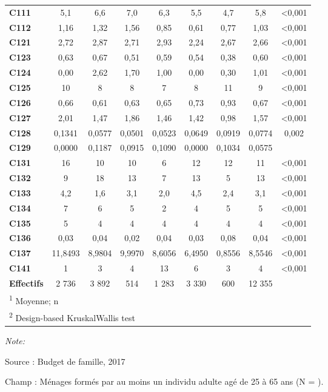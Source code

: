 \documentclass[
  12pt,
]{book}
\begin{document}
\begin{table}[!h]
{\begin{threeparttable}
\begin{tabular}[t]{lcccccccc}
\textbf{C111} & 5,1 & 6,6 & 7,0 & 6,3 & 5,5 & 4,7 & 5,8 & <0,001\\
\textbf{C112} & 1,16 & 1,32 & 1,56 & 0,85 & 0,61 & 0,77 & 1,03 & <0,001\\
\addlinespace
\textbf{C121} & 2,72 & 2,87 & 2,71 & 2,93 & 2,24 & 2,67 & 2,66 & <0,001\\
\textbf{C123} & 0,63 & 0,67 & 0,51 & 0,59 & 0,54 & 0,38 & 0,60 & <0,001\\
\textbf{C124} & 0,00 & 2,62 & 1,70 & 1,00 & 0,00 & 0,30 & 1,01 & <0,001\\
\textbf{C125} & 10 & 8 & 8 & 7 & 8 & 11 & 9 & <0,001\\
\textbf{C126} & 0,66 & 0,61 & 0,63 & 0,65 & 0,73 & 0,93 & 0,67 & <0,001\\
\addlinespace
\textbf{C127} & 2,01 & 1,47 & 1,86 & 1,46 & 1,42 & 0,98 & 1,57 & <0,001\\
\textbf{C128} & 0,1341 & 0,0577 & 0,0501 & 0,0523 & 0,0649 & 0,0919 & 0,0774 & 0,002\\
\textbf{C129} & 0,0000 & 0,1187 & 0,0915 & 0,1090 & 0,0000 & 0,1034 & 0,0575 & \\
\textbf{C131} & 16 & 10 & 10 & 6 & 12 & 12 & 11 & <0,001\\
\textbf{C132} & 9 & 18 & 13 & 7 & 13 & 5 & 13 & <0,001\\
\addlinespace
\textbf{C133} & 4,2 & 1,6 & 3,1 & 2,0 & 4,5 & 2,4 & 3,1 & <0,001\\
\textbf{C134} & 7 & 6 & 5 & 2 & 4 & 5 & 5 & <0,001\\
\textbf{C135} & 5 & 4 & 4 & 4 & 4 & 4 & 4 & <0,001\\
\textbf{C136} & 0,03 & 0,04 & 0,02 & 0,04 & 0,03 & 0,08 & 0,04 & <0,001\\
\textbf{C137} & 11,8493 & 8,9804 & 9,9970 & 8,6056 & 6,4950 & 0,8556 & 8,5546 & <0,001\\
\addlinespace
\textbf{C141} & 1 & 3 & 4 & 13 & 6 & 3 & 4 & <0,001\\
\textbf{Effectifs} & 2 736 & 3 892 & 514 & 1 283 & 3 330 & 600 & 12 355 & \\
\bottomrule
\multicolumn{9}{l}{\rule{0pt}{1em}\textsuperscript{1} Moyenne; n}\\
\multicolumn{9}{l}{\rule{0pt}{1em}\textsuperscript{2} Design-based KruskalWallis test}\\
\end{tabular}
\begin{tablenotes}
\item \textit{Note: } 
\item Source : Budget de famille, 2017
\item Champ : Ménages formés par au moins un individu adulte agé de 25 à 65 ans (N = ).
\end{tablenotes}
\end{threeparttable}}
\end{table}
\end{document}
